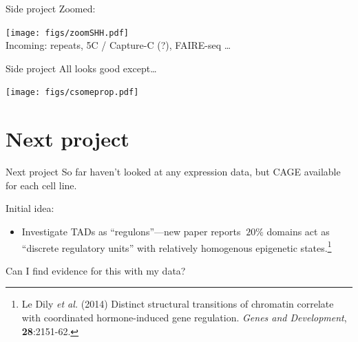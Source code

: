 \documentclass{beamer}
\begin{document}
\begin{frame}{Side project}
Zoomed: \\

\vspace{1em}

\centering

\texttt{[image: figs/zoomSHH.pdf]} \\

Incoming: repeats, 5C / Capture-C (?), FAIRE-seq \dots
\end{frame}

\begin{frame}{Side project}
All looks good except\dots \\

\vspace{1em}

\centering

\texttt{[image: figs/csomeprop.pdf]} \\

\end{frame}

\section{Next project}
\begin{frame}{Next project}
  So far haven't looked at any expression data, but CAGE available for
  each cell line. \\

\vspace{1em}

Initial idea:\\

\vspace{1em}

\begin{itemize}
\item Investigate TADs as ``regulons''---new paper reports $~20\%$
  domains act as ``discrete regulatory units'' with relatively
  homogenous epigenetic states.\footnote{ {\tiny Le Dily \emph{et al.} (2014) Distinct structural transitions of chromatin correlate with
  coordinated hormone-induced gene regulation. \emph{Genes and
    Development}, {\bf 28}:2151-62.} } 
\end{itemize}

\vspace{1em}

Can I find evidence for this with my data?
\end{frame}
\end{document}
